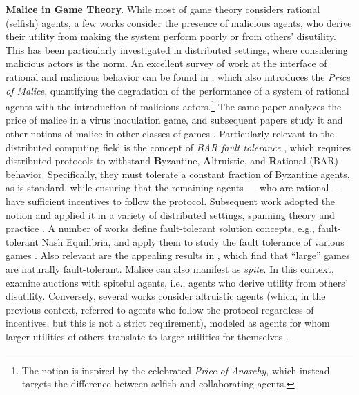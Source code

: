 \noindent\textbf{Malice in Game Theory.} While most of game theory considers rational (selfish) agents, a few works consider the presence of malicious agents, who derive their utility from making the system perform poorly or from others' disutility. This has been particularly investigated in distributed settings, where considering malicious actors is the norm. An excellent survey of work at the interface of rational and malicious behavior can be found in \cite{the_price_of_malice}, which also introduces the \emph{Price of Malice}, quantifying the degradation of the performance of a system of rational agents with the introduction of malicious actors.\footnote{The notion is inspired by the celebrated \emph{Price of Anarchy}, which instead targets the difference between selfish and collaborating agents.} The same paper analyzes the price of malice in a virus inoculation game, and subsequent papers study it and other notions of malice in other classes of games \cite{roth_congestion, babaioff, chakrabarty2009effectmalicesocialoptimum}. Particularly relevant to the distributed computing field is the concept of \emph{BAR fault tolerance} \cite{aiyer}, which requires distributed protocols to withstand \textbf{B}yzantine, \textbf{A}ltruistic, and \textbf{R}ational (BAR) behavior. Specifically, they must tolerate a constant fraction of Byzantine agents, as is standard, while ensuring that the remaining agents --- who are rational --- have sufficient incentives to follow the protocol. Subsequent work adopted the notion and applied it in a variety of distributed settings, spanning theory and practice \cite{bar_2, bar_3, FlightPath}. A number of works define fault-tolerant solution concepts, e.g., fault-tolerant Nash Equilibria, and apply them to study the fault tolerance of various games \cite{eliaz, karakostas_viglas}. Also relevant are the appealing results in \cite{gradwohl}, which find that ``large'' games are naturally fault-tolerant. Malice can also manifest as \emph{spite}. In this context, \cite{brandt, MorganSteiglitzReis} examine auctions with spiteful agents, i.e., agents who derive utility from others' disutility. Conversely, several works consider altruistic agents (which, in the previous context, referred to agents who follow the protocol regardless of incentives, but this is not a strict requirement), modeled as agents for whom larger utilities of others translate to larger utilities for themselves \cite{hoefer_skopalik, meier_yvonne_stefan_roger}.

